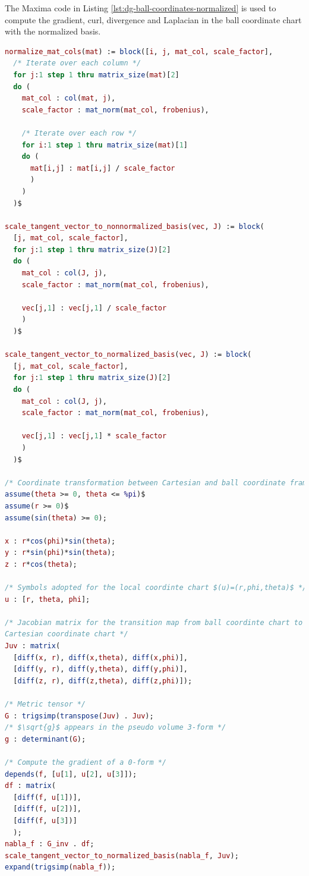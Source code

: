 \documentclass[11pt, a4paper]{book}
\begin{document}
The Maxima code in Listing \ref{lst:dg-ball-coordinates-normalized} is used to compute the
gradient, curl, divergence and Laplacian in the ball coordinate chart with the normalized
basis.
\begin{lstlisting}[caption={Maxima code for computing gradient, curl, divergence and
    Laplacian in the ball coordinate chart.}, label={lst:dg-ball-coordinates-normalized},
  language=maxima]
normalize_mat_cols(mat) := block([i, j, mat_col, scale_factor],
  /* Iterate over each column */
  for j:1 step 1 thru matrix_size(mat)[2]
  do (
    mat_col : col(mat, j),
    scale_factor : mat_norm(mat_col, frobenius),

    /* Iterate over each row */
    for i:1 step 1 thru matrix_size(mat)[1]
    do (
      mat[i,j] : mat[i,j] / scale_factor
      )
    )
  )$

scale_tangent_vector_to_nonnormalized_basis(vec, J) := block(
  [j, mat_col, scale_factor],
  for j:1 step 1 thru matrix_size(J)[2]
  do (
    mat_col : col(J, j),
    scale_factor : mat_norm(mat_col, frobenius),

    vec[j,1] : vec[j,1] / scale_factor
    )
  )$

scale_tangent_vector_to_normalized_basis(vec, J) := block(
  [j, mat_col, scale_factor],
  for j:1 step 1 thru matrix_size(J)[2]
  do (
    mat_col : col(J, j),
    scale_factor : mat_norm(mat_col, frobenius),

    vec[j,1] : vec[j,1] * scale_factor
    )
  )$

/* Coordinate transformation between Cartesian and ball coordinate frames */
assume(theta >= 0, theta <= %pi)$
assume(r >= 0)$
assume(sin(theta) >= 0);

x : r*cos(phi)*sin(theta);
y : r*sin(phi)*sin(theta);
z : r*cos(theta);

/* Symbols adopted for the local coordinte chart $(u)=(r,phi,theta)$ */
u : [r, theta, phi];

/* Jacobian matrix for the transition map from ball coordinte chart to the
Cartesian coordinate chart */
Juv : matrix(
  [diff(x, r), diff(x,theta), diff(x,phi)],
  [diff(y, r), diff(y,theta), diff(y,phi)],
  [diff(z, r), diff(z,theta), diff(z,phi)]);

/* Metric tensor */
G : trigsimp(transpose(Juv) . Juv);
/* $\sqrt{g}$ appears in the pseudo volume 3-form */
g : determinant(G);

/* Compute the gradient of a 0-form */
depends(f, [u[1], u[2], u[3]]);
df : matrix(
  [diff(f, u[1])],
  [diff(f, u[2])],
  [diff(f, u[3])]
  );
nabla_f : G_inv . df;
scale_tangent_vector_to_normalized_basis(nabla_f, Juv);
expand(trigsimp(nabla_f));


\end{lstlisting}
\end{document}
